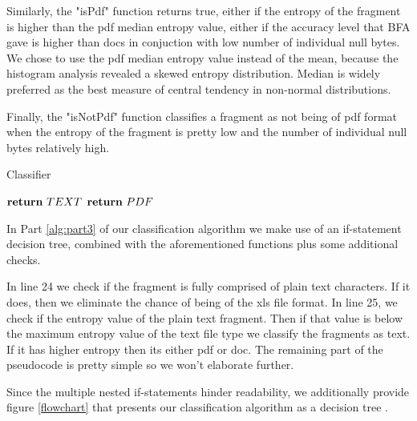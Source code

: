 Similarly, the "isPdf" function returns true, either if the entropy of the fragment is higher than the pdf median entropy value, either if the accuracy level that BFA gave is higher than docs in conjuction with low number of individual null bytes. We chose to use the pdf median entropy value instead of the mean, because the histogram analysis revealed a skewed entropy distribution. Median is widely preferred as the best measure of central tendency in non-normal distributions. 

Finally, the "isNotPdf" function classifies a fragment as not being of pdf format when the entropy of the fragment is pretty low and the number of individual null bytes relatively high.
\pagebreak


\begin{algorithm}[t]
\caption{Classifier}
\label{alg:part3}
\begin{algorithmic}[1]


        \State $\Return \  TEXT$
        \State $\Return \ PDF$
    \Else
    \EndIf
	
\Else
    	    \Else
     \EndIf
 
\EndIf

\end{algorithmic}
\end{algorithm}
In Part \ref{alg:part3} of our classification algorithm we make use of an if-statement decision tree, combined with the aforementioned functions plus some additional checks.

In line 24 we check if the fragment is fully comprised of plain text characters. If it does, then we eliminate the chance of being of the xls file format.
In line 25, we check if the entropy value of the plain text fragment. Then if that value is below the maximum entropy value of the text file type we classify the fragments as text. If it has higher entropy then its either pdf or doc. The remaining part of the pseudocode is pretty simple so we won't elaborate further.

Since the multiple nested if-statements hinder readability, we additionally provide figure \ref{flowchart} that presents our classification algorithm as a decision tree . 

\pagebreak



